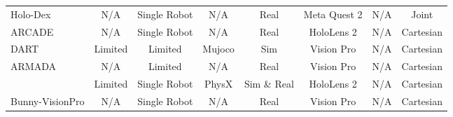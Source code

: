 \begin{table*}[t]
\begin{adjustbox}{max width=\textwidth}
\begin{tabular}{lccccccc}
        Holo-Dex \cite{holodex}                            & \textcolor{goodgray}{N/A}        & \textcolor{goodred}{Single Robot} & \textcolor{goodgray}{N/A}     & \textcolor{goodred}{Real}          & \textcolor{goodred}{Meta Quest 2} & \textcolor{goodgray}{N/A} & \textcolor{goodred}{Joint} \\
        ARCADE \cite{arcade}                               & \textcolor{goodgray}{N/A}        & \textcolor{goodred}{Single Robot} & \textcolor{goodgray}{N/A}     & \textcolor{goodred}{Real}          & \textcolor{goodred}{HoloLens 2}   & \textcolor{goodgray}{N/A} & \textcolor{goodred}{Cartesian} \\
        DART \cite{dexhub-park}                            & \textcolor{goodred}{Limited}     & \textcolor{goodred}{Limited}      & \textcolor{goodred}{Mujoco}   & \textcolor{goodred}{Sim}           & \textcolor{goodred}{Vision Pro}   & \textcolor{goodgray}{N/A} & \textcolor{goodred}{Cartesian} \\
        ARMADA \cite{armada}                               & \textcolor{goodgray}{N/A}        & \textcolor{goodred}{Limited}      & \textcolor{goodgray}{N/A}     & \textcolor{goodred}{Real}          & \textcolor{goodred}{Vision Pro}   & \textcolor{goodgray}{N/A} & \textcolor{goodred}{Cartesian} \\
        \citet{meng2023virtual}                            & \textcolor{goodred}{Limited}     & \textcolor{goodred}{Single Robot} & \textcolor{goodred}{PhysX}   & \textcolor{goodgreen}{Sim \& Real} & \textcolor{goodred}{HoloLens 2}   & \textcolor{goodgray}{N/A} & \textcolor{goodred}{Cartesian} \\
        Bunny-VisionPro \cite{bunnyvisionpro}              & \textcolor{goodgray}{N/A}        & \textcolor{goodred}{Single Robot} & \textcolor{goodgray}{N/A}     & \textcolor{goodred}{Real}          & \textcolor{goodred}{Vision Pro}   & \textcolor{goodgray}{N/A} & \textcolor{goodred}{Cartesian} \\

\end{tabular}
\end{adjustbox}
\end{table*}

